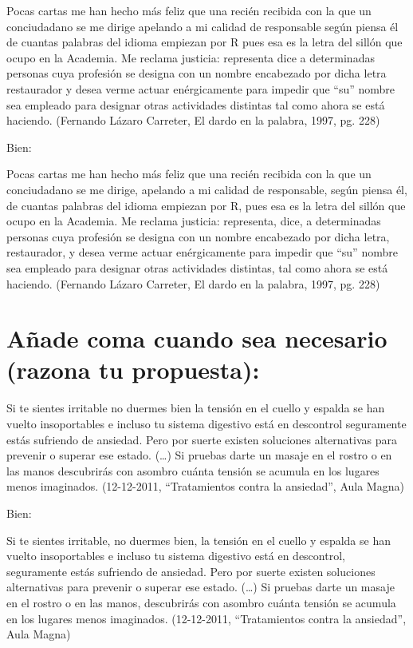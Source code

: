 \documentclass[12pt, a4paper, oneside]{report}
\begin{document}
Pocas cartas me han hecho más feliz que una recién
recibida con la que un conciudadano se me dirige apelando a
mi calidad de responsable según piensa él de cuantas palabras
del idioma empiezan por R pues esa es la letra del sillón que
ocupo en la Academia. Me reclama justicia: representa dice a
determinadas personas cuya profesión se designa con un
nombre encabezado por dicha letra restaurador y desea verme
actuar enérgicamente para impedir que “su” nombre sea
empleado para designar otras actividades distintas tal como
ahora se está haciendo.
(Fernando Lázaro Carreter, El dardo en la palabra, 1997, pg. 228)

Bien:

Pocas cartas me han hecho más feliz que una recién
recibida con la que un conciudadano se me dirige, apelando a
mi calidad de responsable, según piensa él, de cuantas palabras
del idioma empiezan por R, pues esa es la letra del sillón que
ocupo en la Academia. Me reclama justicia: representa, dice, a
determinadas personas cuya profesión se designa con un
nombre encabezado por dicha letra, restaurador, y desea verme
actuar enérgicamente para impedir que “su” nombre sea
empleado para designar otras actividades distintas, tal como
ahora se está haciendo.
(Fernando Lázaro Carreter, El dardo en la palabra, 1997, pg. 228)

\section{Añade coma cuando sea necesario (razona tu propuesta):}

Si te sientes irritable no duermes bien la
tensión en el cuello y espalda se han vuelto
insoportables e incluso tu sistema digestivo está en
descontrol seguramente estás sufriendo de
ansiedad. Pero por suerte existen soluciones
alternativas para prevenir o superar ese estado.
(…)
Si pruebas darte un masaje en el rostro o en
las manos descubrirás con asombro cuánta tensión
se acumula en los lugares menos imaginados.
(12-12-2011, “Tratamientos contra la ansiedad”, Aula
Magna)

Bien:

Si te sientes irritable, no duermes bien, la
tensión en el cuello y espalda se han vuelto
insoportables e incluso tu sistema digestivo está en
descontrol, seguramente estás sufriendo de
ansiedad. Pero por suerte existen soluciones
alternativas para prevenir o superar ese estado.
(…)
Si pruebas darte un masaje en el rostro o en
las manos, descubrirás con asombro cuánta tensión
se acumula en los lugares menos imaginados.
(12-12-2011, “Tratamientos contra la ansiedad”, Aula
Magna)
\end{document}
